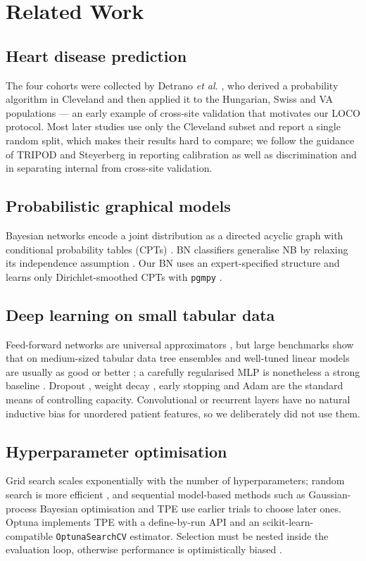 \documentclass[conference]{IEEEtran}
\newcommand{\code}[1]{\texttt{\small #1}}
\begin{document}
\section{Related Work}
\subsection{Heart disease prediction}
The four cohorts were collected by Detrano \textit{et al.} \cite{detrano}, who derived a probability algorithm in Cleveland and then applied it to the Hungarian, Swiss and VA populations --- an early example of cross-site validation that motivates our LOCO protocol. Most later studies use only the Cleveland subset and report a single random split, which makes their results hard to compare; we follow the guidance of TRIPOD \cite{tripod} and Steyerberg \cite{steyerberg} in reporting calibration as well as discrimination and in separating internal from cross-site validation.

\subsection{Probabilistic graphical models}
Bayesian networks encode a joint distribution as a directed acyclic graph with conditional probability tables (CPTs) \cite{pearl,koller}. BN classifiers generalise NB by relaxing its independence assumption \cite{friedman_bnc}. Our BN uses an expert-specified structure and learns only Dirichlet-smoothed CPTs with \code{pgmpy} \cite{pgmpy}.

\subsection{Deep learning on small tabular data}
Feed-forward networks are universal approximators \cite{goodfellow}, but large benchmarks show that on medium-sized tabular data tree ensembles and well-tuned linear models are usually as good or better \cite{grinsztajn,shwartz}; a carefully regularised MLP is nonetheless a strong baseline \cite{gorishniy}. Dropout \cite{dropout}, weight decay \cite{adamw}, early stopping \cite{prechelt} and Adam \cite{adam} are the standard means of controlling capacity. Convolutional or recurrent layers have no natural inductive bias for unordered patient features, so we deliberately did not use them.

\subsection{Hyperparameter optimisation}
Grid search scales exponentially with the number of hyperparameters; random search is more efficient \cite{bergstra_random}, and sequential model-based methods such as Gaussian-process Bayesian optimisation \cite{snoek} and TPE \cite{bergstra} use earlier trials to choose later ones. Optuna \cite{optuna} implements TPE with a define-by-run API and an scikit-learn-compatible \code{OptunaSearchCV} estimator. Selection must be nested inside the evaluation loop, otherwise performance is optimistically biased \cite{varma,cawley}.
\end{document}
